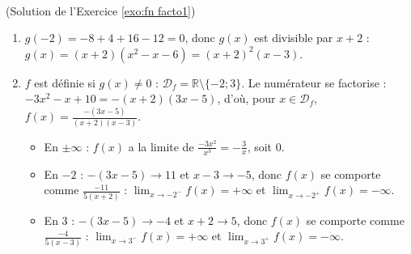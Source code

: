 \begin{corrige}
\begin{sol} ~ \\
(Solution de l'Exercice \ref{exo:fn facto1})
\begin{enumerate}
\item $g(-2) = -8 + 4 + 16 - 12 = 0$, donc $g(x)$ est divisible par $x + 2$ :
      $g(x) = (x+2)(x^2 - x - 6) = (x+2)^2(x-3)$.
\item $f$ est d\'efinie si $g(x) \neq 0$ : $\mathcal{D}_f = \mathbb{R} \setminus \{-2 ; 3\}$.
      Le num\'erateur se factorise : $-3x^2 - x + 10 = -(x+2)(3x-5)$, d'o\`u, pour $x \in \mathcal{D}_f$,
      $f(x) = \frac{-(3x-5)}{(x+2)(x-3)}$.
      \begin{itemize}
      \item En $\pm\infty$ : $f(x)$ a la limite de $\frac{-3x^2}{x^3} = -\frac{3}{x}$, soit $0$.
      \item En $-2$ : $-(3x - 5) \to 11$ et $x - 3 \to -5$, donc $f(x)$ se comporte comme $\frac{-11}{5(x+2)}$ :
            $\lim_{x\to-2^-} f(x) = +\infty$ et $\lim_{x\to-2^+} f(x) = -\infty$.
      \item En $3$ : $-(3x-5) \to -4$ et $x + 2 \to 5$, donc $f(x)$ se comporte comme $\frac{-4}{5(x-3)}$ :
            $\lim_{x\to3^-} f(x) = +\infty$ et $\lim_{x\to3^+} f(x) = -\infty$.
      \end{itemize}
\end{enumerate}
\end{sol}


\end{corrige}
